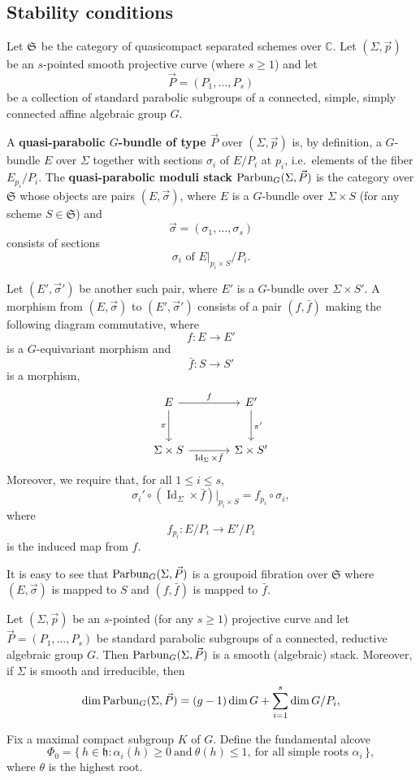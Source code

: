 \documentclass[12pt]{article}
\DeclareMathOperator{\Id}{Id}
\begin{document}
\subsection{Stability conditions}
Let $\mathfrak{S}$ be the category of quasicompact separated schemes over $\mathbb C$. Let \((\Sigma,\vec p)\) be an \(s\)-pointed smooth projective curve (where \(s\ge 1\)) and let
\[\vec P=(P_1,\dots,P_s)
\]be a collection of standard parabolic subgroups of a connected, simple, simply connected affine algebraic group \(G\). 
\begin{definition}
A \textbf{quasi-parabolic \(G\)-bundle of type \(\vec P\)} over \((\Sigma,\vec p)\) is, by definition, a \(G\)-bundle \(E\) over \(\Sigma\) together with sections \(\sigma_i\) of \(E/P_i\) at \(p_i\), i.e.\ elements of the fiber \(E_{p_i}/P_i\). The \textbf{quasi-parabolic moduli stack} $\operatorname{Parbun}_G(\Sigma,\vec P)$
is the category over \(\mathfrak S\) whose objects are pairs \((E,\vec \sigma)\), where \(E\) is a \(G\)-bundle over \(\Sigma\times S\) (for any scheme \(S\in \mathfrak S\)) and
\[
\vec \sigma=(\sigma_1,\dots,\sigma_s)
\]
consists of sections
\[
\sigma_i \text{ of } E|_{p_i\times S}/P_i.
\]

Let \((E',\vec \sigma')\) be another such pair, where \(E'\) is a \(G\)-bundle over \(\Sigma\times S'\). A morphism from \((E,\vec \sigma)\) to \((E',\vec \sigma')\) consists of a pair \((f,\bar f)\) making the following diagram commutative, where
\[
f:E\to E'
\]
is a \(G\)-equivariant morphism and
\[
\bar f:S\to S'
\]
is a morphism,
\[
\begin{tikzcd}[column sep=large, row sep=large]
E \arrow[r,"f"] \arrow[d,"\pi"'] & E' \arrow[d,"\pi'"] \\
\Sigma\times S \arrow[r,"\Id_\Sigma\times \bar f"'] & \Sigma\times S'
\end{tikzcd}
\]
Moreover, we require that, for all \(1\le i\le s\),
\[
\sigma_i'\circ (\Id_\Sigma\times \bar f)|_{p_i\times S}
=
f_{p_i}\circ \sigma_i,
\]
where
\[
f_{p_i}:E/P_i\to E'/P_i
\]
is the induced map from \(f\).
\end{definition}

It is easy to see that \(\operatorname{Parbun}_G(\Sigma,\vec P)\) is a groupoid fibration over \(\mathfrak S\) where \((E,\vec \sigma)\) is mapped to \(S\) and \((f,\bar f)\) is mapped to \(\bar f\).

\begin{theorem}
Let \((\Sigma,\vec p)\) be an \(s\)-pointed (for any \(s\ge 1\)) projective curve and let $\vec P=(P_1,\dots,P_s)$
be standard parabolic subgroups of a connected, reductive algebraic group \(G\). Then $\operatorname{Parbun}_G(\Sigma,\vec P)$
is a smooth (algebraic) stack. Moreover, if \(\Sigma\) is smooth and irreducible, then
\[
\dim \operatorname{Parbun}_G(\Sigma,\vec P)
=
(g-1)\dim G + \sum_{i=1}^s \dim G/P_i,
\]
\end{theorem}
Fix a maximal compact subgroup \(K\) of \(G\). Define the fundamental alcove
\[
\Phi_0=\{\, h\in \mathfrak h : \alpha_i(h)\ge 0 \ \text{and}\ \theta(h)\le 1,\ \text{for all simple roots } \alpha_i \,\},
\]
where \(\theta\) is the highest root.
\end{document}
